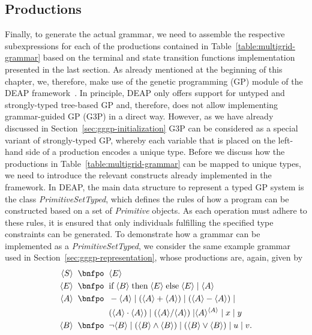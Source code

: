 \subsection{Productions}
\label{sec:evostencils-part1:productions}
Finally, to generate the actual grammar, we need to assemble the respective subexpressions for each of the productions contained in Table~\ref{table:multigrid-grammar} based on the terminal and state transition functions implementation presented in the last section.
As already mentioned at the beginning of this chapter, we, therefore, make use of the genetic programming (GP) module of the DEAP framework~\cite{rainville2012deap}. 
In principle, DEAP only offers support for untyped and strongly-typed tree-based GP and, therefore, does not allow implementing grammar-guided GP (G3P) in a direct way.
However, as we have already discussed in Section~\ref{sec:gggp-initialization} G3P can be considered as a special variant of strongly-typed GP, whereby each variable that is placed on the left-hand side of a production encodes a unique type.
Before we discuss how the productions in Table~\ref{table:multigrid-grammar} can be mapped to unique types, we need to introduce the relevant constructs already implemented in the framework.
In DEAP, the main data structure to represent a typed GP system is the class \emph{PrimitiveSetTyped}, which defines the rules of how a program can be constructed based on a set of \emph{Primitive} objects.
As each operation must adhere to these rules, it is ensured that only individuals fulfilling the specified type constraints can be generated.
To demonstrate how a grammar can be implemented as a \emph{PrimitiveSetTyped}, we consider the same example grammar used in Section~\ref{sec:gggp-representation}, whose productions are, again, given by
\begin{equation*}
	\begin{split}
		\ps S \; \; \bnfpo & \; \; \ps E \\
		\ps E \; \; \bnfpo & \; \; \text{if} \; \ps B \; \text{then} \; \ps E \; \text{else} \; \ps E \; | \; \ps A \\
		\ps A \; \; \bnfpo & \; \; -\ps A \; | \; (\ps A + \ps A) \; | \; (\ps A - \ps A) \; | \\
		& \; \; (\ps A \cdot \ps A) \; | \; (\ps A / \ps A) \; | \ps{A}^{\ps{A}} \; | \; x \; | \; y \\  
		\ps B \; \; \bnfpo & \; \;  \neg \ps B \; | \; (\ps B \wedge \ps B) \; | \; (\ps B \vee \ps B) \; | \; u \; | \; v.
	\end{split}
\end{equation*}
